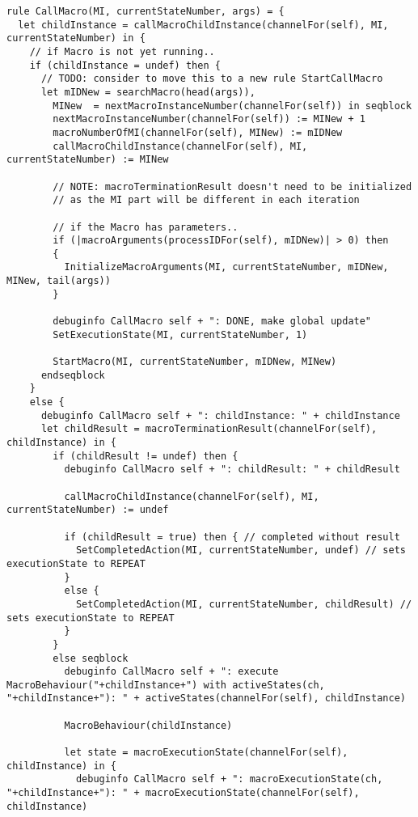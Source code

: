 \begin{listing}[H]
\begin{verbatim}
rule CallMacro(MI, currentStateNumber, args) = {
  let childInstance = callMacroChildInstance(channelFor(self), MI, currentStateNumber) in {
    // if Macro is not yet running..
    if (childInstance = undef) then {
      // TODO: consider to move this to a new rule StartCallMacro
      let mIDNew = searchMacro(head(args)),
        MINew  = nextMacroInstanceNumber(channelFor(self)) in seqblock
        nextMacroInstanceNumber(channelFor(self)) := MINew + 1
        macroNumberOfMI(channelFor(self), MINew) := mIDNew
        callMacroChildInstance(channelFor(self), MI, currentStateNumber) := MINew

        // NOTE: macroTerminationResult doesn't need to be initialized
        // as the MI part will be different in each iteration

        // if the Macro has parameters..
        if (|macroArguments(processIDFor(self), mIDNew)| > 0) then
        {
          InitializeMacroArguments(MI, currentStateNumber, mIDNew, MINew, tail(args))
        }

        debuginfo CallMacro self + ": DONE, make global update"
        SetExecutionState(MI, currentStateNumber, 1)

        StartMacro(MI, currentStateNumber, mIDNew, MINew)
      endseqblock
    }
    else {
      debuginfo CallMacro self + ": childInstance: " + childInstance
      let childResult = macroTerminationResult(channelFor(self), childInstance) in {
        if (childResult != undef) then {
          debuginfo CallMacro self + ": childResult: " + childResult

          callMacroChildInstance(channelFor(self), MI, currentStateNumber) := undef

          if (childResult = true) then { // completed without result
            SetCompletedAction(MI, currentStateNumber, undef) // sets executionState to REPEAT
          }
          else {
            SetCompletedAction(MI, currentStateNumber, childResult) // sets executionState to REPEAT
          }
        }
        else seqblock
          debuginfo CallMacro self + ": execute MacroBehaviour("+childInstance+") with activeStates(ch, "+childInstance+"): " + activeStates(channelFor(self), childInstance)

          MacroBehaviour(childInstance)

          let state = macroExecutionState(channelFor(self), childInstance) in {
            debuginfo CallMacro self + ": macroExecutionState(ch, "+childInstance+"): " + macroExecutionState(channelFor(self), childInstance)


\end{verbatim}
\end{listing}
